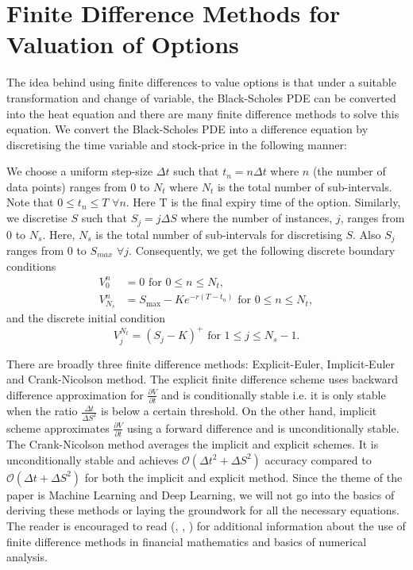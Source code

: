 \documentclass[12pt,a4paper]{article}
\begin{document}
\section{Finite Difference Methods for Valuation of Options}
The idea behind using finite differences to value options is that under a suitable transformation and change of variable, the Black-Scholes PDE can be converted into the heat equation and there are many finite difference methods to solve this equation. We convert the Black-Scholes PDE into a difference equation by discretising the time variable and stock-price in the following manner:

We choose a uniform step-size $\Delta t$ such that $t_n = n\Delta t$ where $n$ (the number of data points) ranges from $0$ to $N_t$ where $N_t$ is the total number of sub-intervals. Note that $0 \leq t_n \leq T \,\,\forall n.$ Here T is the final expiry time of the option. Similarly, we discretise $S$ such that $S_j = j\Delta S$ where the number of instances, $j$, ranges from $0$ to $N_s.$ Here, $N_s$ is the total number of sub-intervals for discretising $S.$ Also $S_j$ ranges from $0$ to $S_{max} \,\,\forall j$. Consequently, we get the following discrete boundary conditions
\begin{align*}
    V_0^n &= 0 \text { for } 0 \leq n \leq N_t,\\
    V_{N_s}^n &= S_{\max} - K e^{-r(T - t_n)} \text { for } 0 \leq n \leq N_t,
\end{align*}
and the discrete initial condition
\[
V_j^{N_t} = (S_j - K)^{+} \text { for } 1 \leq j \leq N_s - 1.
\]

There are broadly three finite difference methods: Explicit-Euler, Implicit-Euler and Crank-Nicolson method. The explicit finite difference scheme uses backward difference approximation for $\frac{\partial V}{\partial t}$ and is conditionally stable i.e. it is only stable when the ratio $\frac{\Delta t}{\Delta S^2}$ is below a certain threshold. On the other hand, implicit scheme approximates $\frac{\partial V}{\partial t}$ using a forward difference and is unconditionally stable. The Crank-Nicolson method averages the implicit and explicit schemes. It is unconditionally stable and achieves $\mathcal{O}(\Delta t^2 + \Delta S^2)$ accuracy compared to $\mathcal{O}(\Delta t + \Delta S^2)$ for both the implicit and explicit method. Since the theme of the paper is Machine Learning and Deep Learning, we will not go into the basics of deriving these methods or laying the groundwork for all the necessary equations. The reader is encouraged to read (\cite{intHoutKarel2017NPDE}, \cite{HighamDesmondJ.2004}, ) for additional information about the use of finite difference methods in financial mathematics and basics of numerical analysis.
\end{document}
